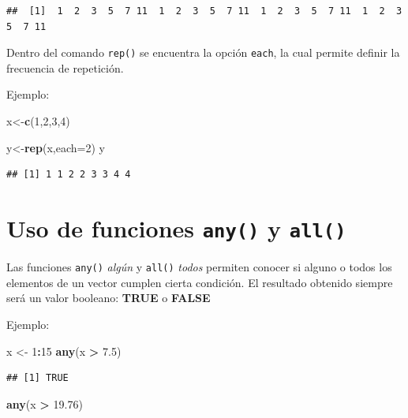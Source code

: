 \documentclass[
]{book}
\newenvironment{Shaded}{\begin{snugshade}}{\end{snugshade}}
\newcommand{\AttributeTok}[1]{\textcolor[rgb]{0.13,0.29,0.53}{#1}}
\newcommand{\DecValTok}[1]{\textcolor[rgb]{0.00,0.00,0.81}{#1}}
\newcommand{\FloatTok}[1]{\textcolor[rgb]{0.00,0.00,0.81}{#1}}
\newcommand{\FunctionTok}[1]{\textcolor[rgb]{0.13,0.29,0.53}{\textbf{#1}}}
\newcommand{\NormalTok}[1]{#1}
\newcommand{\OtherTok}[1]{\textcolor[rgb]{0.56,0.35,0.01}{#1}}
\newcommand{\SpecialCharTok}[1]{\textcolor[rgb]{0.81,0.36,0.00}{\textbf{#1}}}
\begin{document}
\begin{verbatim}
##  [1]  1  2  3  5  7 11  1  2  3  5  7 11  1  2  3  5  7 11  1  2  3  5  7 11
\end{verbatim}

Dentro del comando \texttt{rep()} se encuentra la opción \texttt{each}, la cual permite definir la frecuencia de repetición.

Ejemplo:

\begin{Shaded}
\begin{Highlighting}[]
\NormalTok{x}\OtherTok{\textless{}{-}}\FunctionTok{c}\NormalTok{(}\DecValTok{1}\NormalTok{,}\DecValTok{2}\NormalTok{,}\DecValTok{3}\NormalTok{,}\DecValTok{4}\NormalTok{)}

\NormalTok{y}\OtherTok{\textless{}{-}}\FunctionTok{rep}\NormalTok{(x,}\AttributeTok{each=}\DecValTok{2}\NormalTok{)}
\NormalTok{y}
\end{Highlighting}
\end{Shaded}

\begin{verbatim}
## [1] 1 1 2 2 3 3 4 4
\end{verbatim}

\section{\texorpdfstring{Uso de funciones \texttt{any()} y \texttt{all()}}{Uso de funciones any() y all()}}\label{uso-de-funciones-any-y-all}

Las funciones \texttt{any()} \emph{algún} y \texttt{all()} \emph{todos} permiten conocer si alguno o todos los elementos de un vector cumplen cierta condición.
El resultado obtenido siempre será un valor booleano: \textbf{TRUE} o \textbf{FALSE}

Ejemplo:

\begin{Shaded}
\begin{Highlighting}[]
\NormalTok{x }\OtherTok{\textless{}{-}} \DecValTok{1}\SpecialCharTok{:}\DecValTok{15}
\FunctionTok{any}\NormalTok{(x }\SpecialCharTok{\textgreater{}} \FloatTok{7.5}\NormalTok{)}
\end{Highlighting}
\end{Shaded}

\begin{verbatim}
## [1] TRUE
\end{verbatim}

\begin{Shaded}
\begin{Highlighting}[]
\FunctionTok{any}\NormalTok{(x }\SpecialCharTok{\textgreater{}} \FloatTok{19.76}\NormalTok{)}
\end{Highlighting}
\end{Shaded}
\end{document}
